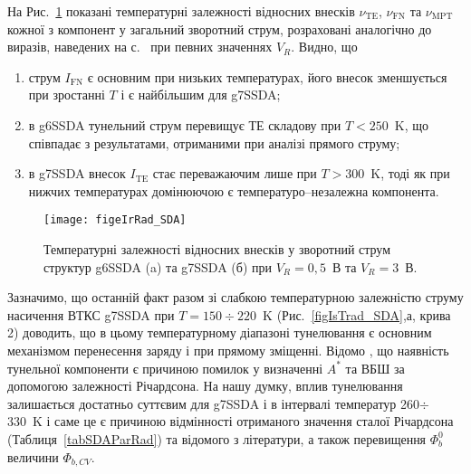На Рис.~\ref{figeIrRad_SDA} показані температурні залежності відносних внесків $\nu_\mathrm{TE}$, $\nu_\mathrm{FN}$ та $\nu_\mathrm{MPT}$
кожної з компонент у загальний зворотний струм, розраховані аналогічно до виразів, наведених на с.~\pageref{nu_IR} при певних значеннях $V_R$.
Видно, що
\begin{enumerate}[label=\asbuk*),leftmargin=0em,itemindent=1.5em]
\item струм $I_\mathrm{FN}$ є основним при низьких температурах, його внесок зменшується при зростанні $T$ і є найбільшим для g7SSDA;
\item в g6SSDA тунельний струм перевищує ТЕ складову при $T<250$~K, що співпадає з результатами, отриманими при аналізі прямого струму;
\item в g7SSDA внесок $I_\mathrm{TE}$ стає переважаючим лише при $T>300$~K, тоді як при нижчих температурах домінюючою є температуро--незалежна компонента.
\end{enumerate}

\begin{figure}
\center
\texttt{[image: figeIrRad\_SDA]}
\caption{\label{figeIrRad_SDA}
Температурні залежності відносних внесків у зворотний струм
структур g6SSDA (a) та g7SSDA (б)
при $V_R=0,5$~В та $V_R=3$~В.
}%
\end{figure}

Зазначимо, що останній факт разом зі слабкою температурною залежністю струму насичення ВТКС g7SSDA при $T=150\div220$~K (Рис.~\ref{figIsTrad_SDA},а, крива 2)
доводить, що в цьому температурному діапазоні тунелювання є основним механізмом перенесення заряду і при прямому зміщенні.
Відомо \cite{Yu}, що наявність тунельної компоненти є причиною помилок у визначенні $A^*$ та ВБШ за допомогою залежності Річардсона.
На нашу думку, вплив тунелювання залишається достатньо суттєвим для g7SSDA і в інтервалі температур 260$\div$330~K і саме це є причиною
відмінності отриманого значення сталої Річардсона (Таблиця~\ref{tabSDAParRad}) та відомого з літератури, а також перевищення $\Phi_b^0$ величини $\Phi_{b,CV}$.

